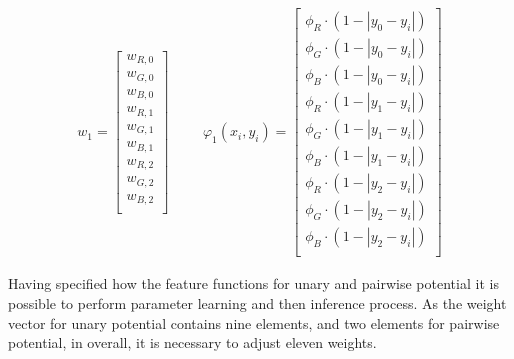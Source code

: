 \begin{equation}
    \label{eq:vectors_nonlinear}
    \begin{matrix} 
        w_1 = \begin{bmatrix}
            w_{R,0}\\ 
            w_{G,0}\\
            w_{B,0}\\
            w_{R,1}\\ 
            w_{G,1}\\
            w_{B,1}\\
            w_{R,2}\\ 
            w_{G,2}\\
            w_{B,2}\\
        \end{bmatrix}
        & & &
        \varphi_1(x_i,y_i) = \begin{bmatrix}
            \phi_{R} \cdot (1-\left | y_0 - y_i \right |)\\ 
            \phi_{G} \cdot (1-\left | y_0 - y_i \right |)\\
            \phi_{B} \cdot (1-\left | y_0 - y_i \right |)\\
            \phi_{R} \cdot (1-\left | y_1 - y_i \right |)\\ 
            \phi_{G} \cdot (1-\left | y_1 - y_i \right |)\\
            \phi_{B} \cdot (1-\left | y_1 - y_i \right |)\\
            \phi_{R} \cdot (1-\left | y_2 - y_i \right |)\\ 
            \phi_{G} \cdot (1-\left | y_2 - y_i \right |)\\
            \phi_{B} \cdot (1-\left | y_2 - y_i \right |)\\
        \end{bmatrix}
    \end{matrix} 
\end{equation}

Having specified how the feature functions for unary and pairwise potential it is possible to perform parameter learning and then inference process. As the weight vector for unary potential contains nine elements, and two elements for pairwise potential, in overall, it is necessary to adjust eleven weights. 